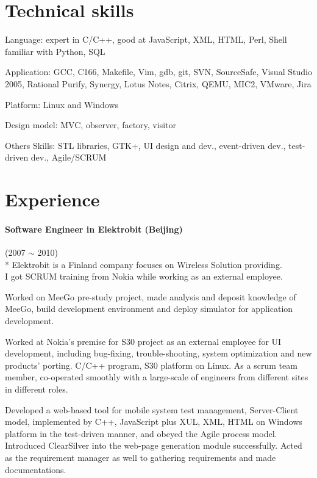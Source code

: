 \documentclass[a4paper,11pt]{article}
\begin{document}
\section*{Technical skills}
\begin{description*}
    \setlength\itemindent{0cm}
    \setlength\itemsep{0.4em}
  \item [Language:] expert in C/C++, good at JavaScript, XML, HTML, Perl, Shell familiar with Python, SQL
  \item [Application:] GCC, C166, Makefile, Vim, gdb, git, SVN, SourceSafe, Visual Studio 2005, Rational Purify, Synergy, Lotus Notes, Citrix, QEMU, MIC2, VMware, Jira
  \item [Platform:] Linux and Windows
  \item [Design model:] MVC, observer, factory, visitor
  \item [Others Skills:] STL libraries, GTK+, UI design and dev., event-driven dev., test-driven dev., Agile/SCRUM
\end{description*}

\section*{Experience}

\paragraph{Software Engineer in Elektrobit (Beijing)} (2007 $\sim$ 2010) \\*
Elektrobit is a Finland company focuses on Wireless Solution providing. \\
I got SCRUM training from Nokia while working as an external employee.
\begin{itemize*}
    \setlength\itemsep{0.4em}
  \item Worked on MeeGo pre-study project, made analysis and deposit knowledge of MeeGo, build development environment and deploy simulator for application development.
  \item Worked at Nokia's premise for S30 project as an external employee for UI development, including bug-fixing, trouble-shooting, system optimization and new products' porting. C/C++ program, S30 platform on Linux. As a scrum team member, co-operated smoothly with a large-scale of engineers from different sites in different roles.
  \item Developed a web-based tool for mobile system test management, Server-Client model, implemented by C++, JavaScript plus XUL, XML, HTML on Windows platform in the test-driven manner, and obeyed the Agile process model. Introduced ClearSilver into the web-page generation module successfully. Acted as the requirement manager as well to gathering requirements and made documentations.
\end{itemize*}
\end{document}

